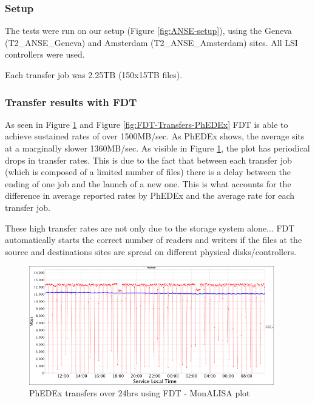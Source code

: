 \subsubsection{Setup}

The tests were run on our setup (Figure \ref{fig:ANSE-setup}), using the Geneva
(T2\_ANSE\_Geneva) and Amsterdam (T2\_ANSE\_Amsterdam) sites. All LSI controllers
were used.

Each transfer job was 2.25TB (150x15TB files).

\subsubsection{Transfer results with FDT}

As seen in Figure \ref{fig:FDT-Transfers} and Figure \ref{fig:FDT-Transfers-PhEDEx}
FDT is able to achieve sustained rates of over 1500MB/sec. As PhEDEx shows,
the average sits at a marginally slower 1360MB/sec. As visible in 
Figure \ref{fig:FDT-Transfers}, the plot has periodical drops in transfer rates.
This is due to the fact that between each transfer job (which is composed of a limited
number of files) there is a delay between the ending of one job and the launch of
a new one. This is what accounts for the difference in average reported rates by PhEDEx
and the average rate for each transfer job.

These high transfer rates are not only due to the storage system alone... FDT 
automatically starts the correct number of readers and writers if the files at 
the source and destinations sites are spread on different physical disks/controllers.

\begin{figure}[h]
  \centering
  \includegraphics[width=0.95\textwidth]{Figures/FDT-transfers.png}
  \caption{PhEDEx transfers over 24hrs using FDT - MonALISA plot}
  \label{fig:FDT-Transfers}
\end{figure} 

